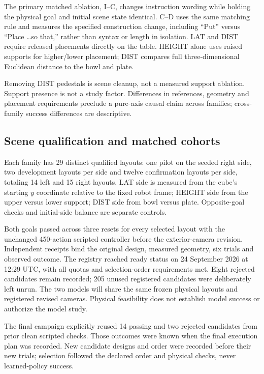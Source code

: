 The primary matched ablation, I--C, changes instruction wording while holding the physical goal and initial scene state identical. C--D uses the same matching rule and measures the specified construction change, including ``Put'' versus ``Place \ldots so that,'' rather than syntax or length in isolation. LAT and DIST require released placements directly on the table. HEIGHT alone uses raised supports for higher/lower placement; DIST compares full three-dimensional Euclidean distance to the bowl and plate.

Removing DIST pedestals is scene cleanup, not a measured support ablation. Support presence is not a study factor. Differences in references, geometry and placement requirements preclude a pure-axis causal claim across families; cross-family success differences are descriptive.

\subsection{Scene qualification and matched cohorts}
Each family has 29 distinct qualified layouts: one pilot on the seeded right side, two development layouts per side and twelve confirmation layouts per side, totaling 14 left and 15 right layouts. LAT side is measured from the cube's starting $y$ coordinate relative to the fixed robot frame; HEIGHT side from the upper versus lower support; DIST side from bowl versus plate. Opposite-goal checks and initial-side balance are separate controls.

Both goals passed across three resets for every selected layout with the unchanged 450-action scripted controller before the exterior-camera revision. Independent receipts bind the original design, measured geometry, six trials and observed outcome. The registry reached ready status on 24 September 2026 at 12:29 UTC, with all quotas and selection-order requirements met. Eight rejected candidates remain recorded; 205 unused registered candidates were deliberately left unrun. The two models will share the same frozen physical layouts and registered revised cameras. Physical feasibility does not establish model success or authorize the model study.

The final campaign explicitly reused 14 passing and two rejected candidates from prior clean scripted checks. Those outcomes were known when the final execution plan was recorded. New candidate designs and order were recorded before their new trials; selection followed the declared order and physical checks, never learned-policy success.


